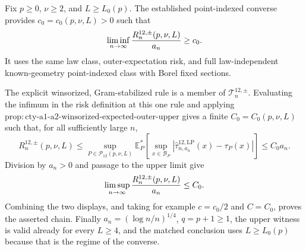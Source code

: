 Fix \(p\geq0\), \(\nu\geq2\), and \(L\geq L_0(p)\).  The established point-indexed converse provides \(c_0=c_0(p,\nu,L)>0\) such that
\[
 \liminf_{n\to\infty}{R_n^{12,\pm}(p,\nu,L)\over a_n}\geq c_0.
\]
It uses the same law class, outer-expectation risk, and full law-independent known-geometry point-indexed class with Borel fixed sections.

The explicit winsorized, Gram-stabilized rule is a member of \(\mathcal T_n^{12,\pm}\).  Evaluating the infimum in the risk definition at this one rule and applying \(\mathrm{prop:cty\text{-}a1\text{-}a2\text{-}winsorized\text{-}expected\text{-}outer\text{-}upper}\) gives a finite \(C_0=C_0(p,\nu,L)\) such that, for all sufficiently large \(n\),
\[
 R_n^{12,\pm}(p,\nu,L)
 \leq\sup_{P\in\mathcal P_{12}(p,\nu,L)}
 \mathbb E_P^*\!\left[\sup_{x\in\mathcal B_P}
 |\widehat\tau^{12,\mathrm{LP}}_{n,a_n}(x)-\tau_P(x)|\right]
 \leq C_0a_n.
\]
Division by \(a_n>0\) and passage to the upper limit give
\[
 \limsup_{n\to\infty}{R_n^{12,\pm}(p,\nu,L)\over a_n}\leq C_0.
\]
Combining the two displays, and taking for example \(c=c_0/2\) and \(C=C_0\), proves the asserted chain.  Finally \(a_n=(\log n/n)^{1/4}\), \(q=p+1\geq1\), the upper witness is valid already for every \(L\geq4\), and the matched conclusion uses \(L\geq L_0(p)\) because that is the regime of the converse.